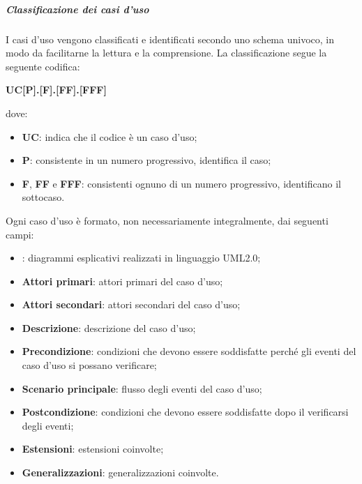 \documentclass[../norme-di-progetto.tex]{subfiles}
\begin{document}
\subparagraph{Classificazione dei casi d'uso}
I casi d'uso vengono classificati e identificati secondo uno schema univoco, in modo da facilitarne la lettura e la comprensione. La classificazione segue la seguente codifica: \\
\begin{center}
  \centering
  \textbf{UC[P].[F].[FF].[FFF]}
\end{center} dove:
\begin{itemize}
  \item \textbf{UC}: indica che il codice è un caso d'uso;
  \item \textbf{P}: consistente in un numero progressivo, identifica il caso;
  \item \textbf{F}, \textbf{FF} e \textbf{FFF}: consistenti ognuno di un numero progressivo, identificano il sottocaso.
\end{itemize}
Ogni caso d'uso è formato, non necessariamente integralmente, dai seguenti campi:
\begin{itemize}
  \item \textbf{}: diagrammi esplicativi realizzati in linguaggio UML2.0;
  \item \textbf{Attori primari}: attori primari del caso d'uso;
  \item \textbf{Attori secondari}: attori secondari del caso d'uso;
  \item \textbf{Descrizione}: descrizione del caso d'uso;
  \item \textbf{Precondizione}: condizioni che devono essere soddisfatte perché gli eventi del caso d'uso si possano verificare;
  \item \textbf{Scenario principale}: flusso degli eventi del caso d'uso;
  \item \textbf{Postcondizione}: condizioni che devono essere soddisfatte dopo il verificarsi degli eventi;
  \item \textbf{Estensioni}: estensioni coinvolte;
  \item \textbf{Generalizzazioni}: generalizzazioni coinvolte.
\end{itemize}
\end{document}
